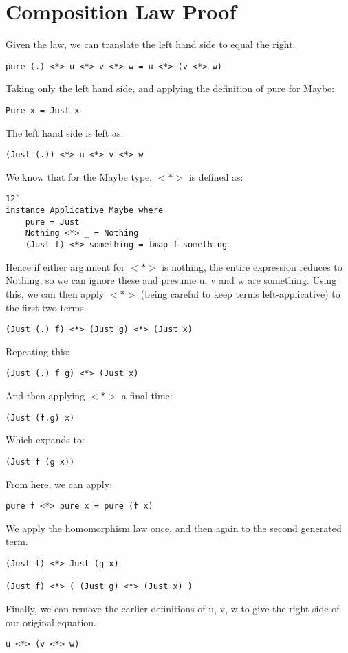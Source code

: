 \section{Composition Law Proof}
\begin{normalsize}
Given the law, we can translate the left hand side to equal the right.
\begin{lstlisting}[style=code]
pure (.) <*> u <*> v <*> w = u <*> (v <*> w)
\end{lstlisting}
Taking only the left hand side, and applying the definition of pure for Maybe:
\begin{lstlisting}[style=code]
Pure x = Just x
\end{lstlisting}
The left hand side is left as:
\begin{lstlisting}[style=code]
(Just (.)) <*> u <*> v <*> w 
\end{lstlisting}
We know that for the Maybe type, $<*>$ is defined as:
\begin{lstlisting}[style=code] 	12`	
instance Applicative Maybe where  
    pure = Just  
    Nothing <*> _ = Nothing  
    (Just f) <*> something = fmap f something  
\end{lstlisting}
Hence if either argument for $<*>$ is nothing, the entire expression reduces to Nothing, so we can ignore these and presume u, v and w are something. Using this, we can then apply $<*>$ (being careful to keep terms left-applicative) to the first two terms.
\begin{lstlisting}[style=code]
(Just (.) f) <*> (Just g) <*> (Just x)
\end{lstlisting}
Repeating this:
\begin{lstlisting}[style=code]
(Just (.) f g) <*> (Just x)
\end{lstlisting}
And then applying $<*>$ a final time:
\begin{lstlisting}[style=code]
(Just (f.g) x)
\end{lstlisting}
Which expands to:
\begin{lstlisting}[style=code]
(Just f (g x))
\end{lstlisting}

From here, we can apply:
\begin{lstlisting}[style=code]
pure f <*> pure x = pure (f x)
\end{lstlisting}
We apply the homomorphism law once, and then again to the second generated term. 
\begin{lstlisting}[style=code]
(Just f) <*> Just (g x) 

(Just f) <*> ( (Just g) <*> (Just x) )
\end{lstlisting}

Finally, we can remove the earlier definitions of u, v, w to give the right side of our original equation.
\begin{lstlisting}[style=code]
u <*> (v <*> w)
\end{lstlisting}
\end{normalsize}